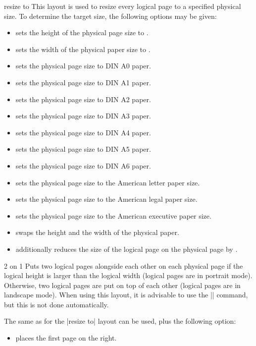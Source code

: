 \begin{pgflayout}{resize to}
    This layout is used to resize every logical page to a specified physical
    size. To determine the target size, the following options may be given:
    \begin{itemize}
        \item {} sets the height of
            the physical page size to .
        \item {} sets the width of
            the physical paper size to .
        \item {} sets the physical page size to DIN A0 paper.
        \item {} sets the physical page size to DIN A1 paper.
        \item {} sets the physical page size to DIN A2 paper.
        \item {} sets the physical page size to DIN A3 paper.
        \item {} sets the physical page size to DIN A4 paper.
        \item {} sets the physical page size to DIN A5 paper.
        \item {} sets the physical page size to DIN A6 paper.
        \item {} sets the physical page size to the
            American letter paper size.
        \item {} sets the physical page size to the
            American legal paper size.
        \item {} sets the physical page size to the
            American executive paper size.
        \item {} swaps the height and the width of the
            physical paper.
        \item {} additionally reduces the
            size of the logical page on the physical page by .
    \end{itemize}
\end{pgflayout}

\begin{pgflayout}{2 on 1}
    Puts two logical pages alongside each other on each physical page if the
    logical height is larger than the logical width (logical pages are in
    portrait mode). Otherwise, two logical pages are put on top of each other
    (logical pages are in landscape mode). When using this layout, it is
    advisable to use the |\nofiles| command, but this is not done
    automatically.

    The same  as for the |resize to| layout can be used, plus the
    following option:
    \begin{itemize}
        \item {} places the first page on the
            right.
    \end{itemize}
\end{pgflayout}

